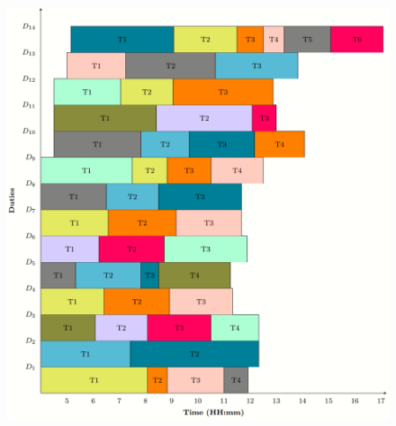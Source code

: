 \documentclass[handout]{beamer}
\begin{document}
\begin{frame}
\begin{columns}[b]
\begin{figure}
			    \includegraphics[width=\textwidth]{Images/schedule.PNG} \
			\end{figure}
	\end{columns}

	
\vspace{\baselineskip}
\vspace{\baselineskip}
\vspace{\baselineskip}
\vspace{\baselineskip}
\end{frame}

\end{document}
